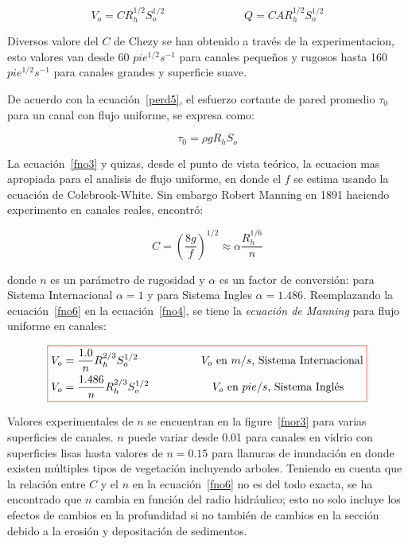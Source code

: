 \documentclass[11pt, oneside]{article}
\begin{document}
\begin{equation}
V_o = C R_h^{1/2} S_o^{1/2} \hspace{3cm} Q = CAR_h^{1/2} S_o^{1/2}
\label{fno4}
\end{equation}

Diversos valore del $C$ de Chezy se han obtenido a trav\'es de la experimentacion, esto valores van desde 60 $pie^{1/2} s^{-1}$ para canales peque\~nos y rugosos hasta 160 $pie^{1/2} s^{-1}$ para canales grandes y superficie suave.

De acuerdo con la ecuaci\'on~\ref{perd5}, el esfuerzo cortante de pared promedio $\tau_0$ para un canal con flujo uniforme, se expresa como:

\begin{equation}
\tau_0 = \rho g R_h S_o
\label{fno5}
\end{equation}

La ecuaci\'on~\ref{fno3} y quizas, desde el punto de vista te\'orico, la ecuacion mas apropiada para el analisis de flujo uniforme, en donde el $f$ se estima usando la ecuaci\'on de Colebrook-White. Sin embargo Robert Manning en 1891 haciendo experimento en canales reales, encontr\'o:


\begin{equation}
C = \left( \frac{8g}{f} \right)^{1/2}  \approx \alpha \frac{R_h^{1/6}}{n}
\label{fno6}
\end{equation}

donde $n$ es un par\'ametro de rugosidad y $\alpha$ es un factor de conversi\'on: para Sistema Internacional $\alpha = 1$ y para Sistema Ingles $\alpha=1.486$. Reemplazando la ecuaci\'on~\ref{fno6} en la ecuaci\'on~\ref{fno4}, se tiene la \emph{ecuaci\'on de Manning} para flujo uniforme en canales:

\begin{equation}
\color{red}\boxed{\color{black}
\begin{split}
& V_o = \frac{1.0}{n} R_h^{2/3} S_o^{1/2} \hspace{2cm} \text{$V_o$ en $m/s$, Sistema Internacional}\\
& V_o = \frac{1.486}{n} R_h^{2/3} S_o^{1/2} \hspace{2cm} \text{$V_o$ en $pie/s$, Sistema Ingl\'es}
\end{split}
}
\label{fno7}
\end{equation}

Valores experimentales de $n$ se encuentran en la figure~\ref{fnor3} para varias superficies de canales. $n$ puede variar desde 0.01 para canales en vidrio con superficies lisas hasta valores de $n=0.15$ para llanuras de inundaci\'on en donde existen m\'ultiples tipos de vegetaci\'on incluyendo arboles. Teniendo en cuenta que la relaci\'on entre $C$ y el $n$ en la ecuaci\'on~\ref{fno6} no es del todo exacta, se ha encontrado que $n$ cambia en funci\'on del radio hidr\'aulico; esto no solo incluye los efectos de cambios en la profundidad si no tambi\'en de cambios en la secci\'on debido a la erosi\'on y depositaci\'on de sedimentos.   
\end{document}
